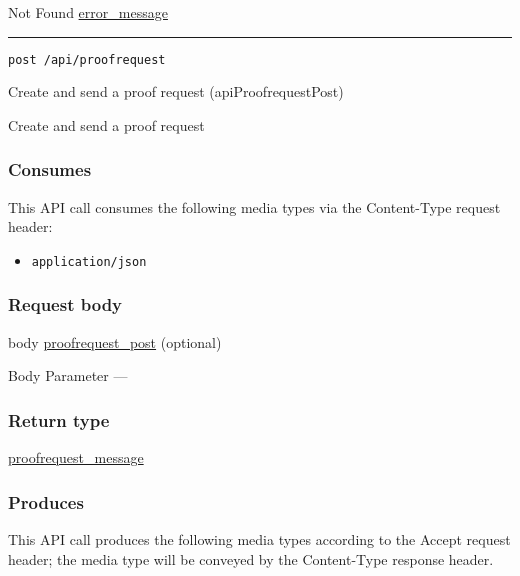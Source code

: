 Not Found \protect\hyperlink{error_message}{error\_message}

\begin{center}\rule{0.5\linewidth}{\linethickness}\end{center}

\protect\hypertarget{apiProofrequestPost}{}{}

\begin{verbatim}
post /api/proofrequest
\end{verbatim}

Create and send a proof request ({apiProofrequestPost})

Create and send a proof request

\hypertarget{consumes-33}{%
\subsubsection{Consumes}\label{consumes-33}}

This API call consumes the following media types via the {Content-Type}
request header:

\begin{itemize}
\tightlist
\item
  \texttt{application/json}
\end{itemize}

\hypertarget{request-body-33}{%
\subsubsection{Request body}\label{request-body-33}}

body \protect\hyperlink{proofrequest_post}{proofrequest\_post}
(optional)

{Body Parameter} ---

\hypertarget{return-type-80}{%
\subsubsection{Return type}\label{return-type-80}}

\protect\hyperlink{proofrequest_message}{proofrequest\_message}

\hypertarget{produces-101}{%
\subsubsection{Produces}\label{produces-101}}

This API call produces the following media types according to the
{Accept} request header; the media type will be conveyed by the
{Content-Type} response header.

